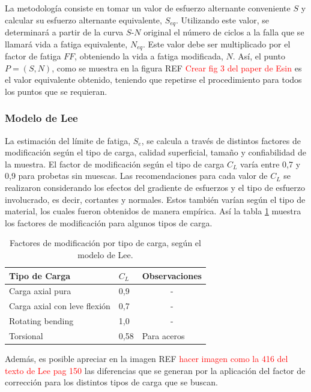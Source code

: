 La metodología consiste en tomar un valor de esfuerzo alternante conveniente $S$ y calcular su esfuerzo alternante equivalente, $S_{eq}$. Utilizando este valor, se determinará a partir de la curva $S$-$N$ original el número de ciclos a la falla que se llamará vida a fatiga equivalente, $N_{eq}$. Este valor debe ser multiplicado por el factor de fatiga $FF$, obteniendo la vida a fatiga modificada, $N$. Así, el punto $P=(S,N)$, como se muestra en la figura REF \textcolor{red}{Crear fig 3 del paper de Esin} es el valor equivalente obtenido, teniendo que repetirse el procedimiento para todos los puntos que se requieran.

\subsubsection{Modelo de Lee}
La estimación del límite de fatiga, $S_e$, se calcula a través de distintos factores de modificación según el tipo de carga, calidad superficial, tamaño y confiabilidad de la muestra. El factor de modificación según el tipo de carga $C_L$ varía entre 0,7 y 0,9 para probetas sin muescas. Las recomendaciones para cada valor de $C_L$ se realizaron considerando los efectos del gradiente de esfuerzos y el tipo de esfuerzo involucrado, es decir, cortantes y normales. Estos también varían según el tipo de material, los cuales fueron obtenidos de manera empírica. Así la tabla \ref{tab:lee_factor} muestra los factores de modificación para algunos tipos de carga.

\begin{table}[h]
\centering
\begin{tabular}{@{}llc@{}}
\toprule
Tipo de Carga                & $C_L$ & \multicolumn{1}{l}{Observaciones} \\ \midrule
Carga axial pura             & 0,9   & -                                 \\
Carga axial con leve flexión & 0,7   & -                                 \\
Rotating bending             & 1,0   & -                                 \\
Torsional                    & 0,58  & \multicolumn{1}{l}{Para aceros}   \\ \bottomrule
\end{tabular}
\caption{Factores de modificación por tipo de carga, según el modelo de Lee.}
\label{tab:lee_factor}
\end{table}

Además, es posible apreciar en la imagen REF \textcolor{red}{hacer imagen como la 416 del texto de Lee pag 150} las diferencias que se generan por la aplicación del factor de corrección para los distintos tipos de carga que se buscan. 

